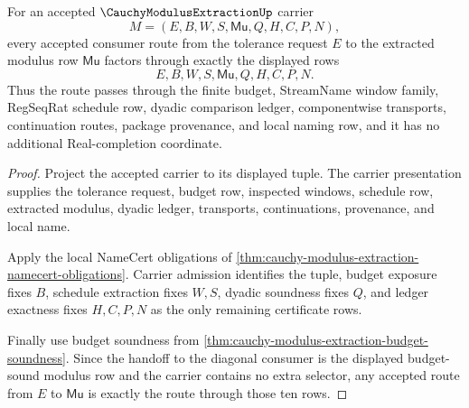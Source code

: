 \begin{theorem}
\label{thm:cauchy-modulus-extraction-route-exactness}
For an accepted $\CauchyModulusExtractionUp$ carrier
$$
M=(E,B,W,S,\mathsf{Mu},Q,H,C,P,N),
$$
every accepted consumer route from the tolerance request $E$ to the extracted modulus row $\mathsf{Mu}$ factors through exactly the displayed rows
$$
E,B,W,S,\mathsf{Mu},Q,H,C,P,N.
$$
Thus the route passes through the finite budget, StreamName window family, RegSeqRat schedule row, dyadic comparison ledger, componentwise transports, continuation routes, package provenance, and local naming row, and it has no additional Real-completion coordinate.
\end{theorem}
\begin{proof}
Project the accepted carrier to its displayed tuple. The carrier presentation supplies the tolerance request, budget row, inspected windows, schedule row, extracted modulus, dyadic ledger, transports, continuations, provenance, and local name.

Apply the local NameCert obligations of \autoref{thm:cauchy-modulus-extraction-namecert-obligations}. Carrier admission identifies the tuple, budget exposure fixes $B$, schedule extraction fixes $W,S$, dyadic soundness fixes $Q$, and ledger exactness fixes $H,C,P,N$ as the only remaining certificate rows.

Finally use budget soundness from \autoref{thm:cauchy-modulus-extraction-budget-soundness}. Since the handoff to the diagonal consumer is the displayed budget-sound modulus row and the carrier contains no extra selector, any accepted route from $E$ to $\mathsf{Mu}$ is exactly the route through those ten rows.
\end{proof}

